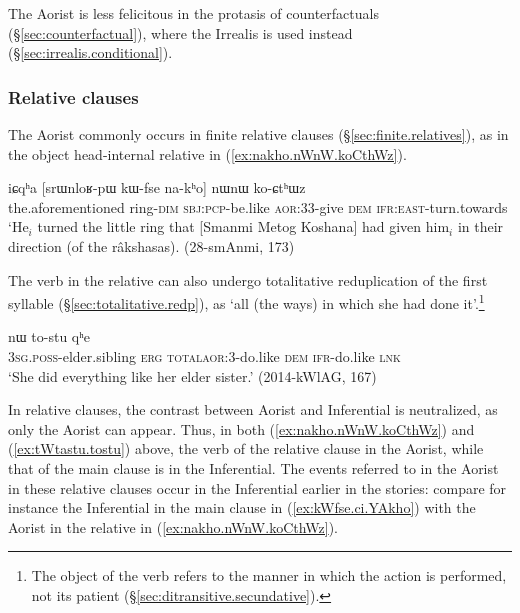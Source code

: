 The Aorist is less felicitous in the protasis of counterfactuals (§\ref{sec:counterfactual}), where the Irrealis is used instead (§\ref{sec:irrealis.conditional}).

\subsubsection{Relative clauses }   \label{sec:aor.relative}
The Aorist commonly occurs in finite relative clauses (§\ref{sec:finite.relatives}), as in the object head-internal relative in (\ref{ex:nakho.nWnW.koCthWz}).


\begin{exe}
\ex \label{ex:nakho.nWnW.koCthWz}
\gll iɕqʰa [srɯnloʁ-pɯ kɯ-fse na-kʰo] nɯnɯ ko-ɕtʰɯz \\
the.aforementioned ring-\textsc{dim} \textsc{sbj}:\textsc{pcp}-be.like \textsc{aor}:3\fl{}3-give \textsc{dem} \textsc{ifr}:\textsc{east}-turn.towards \\
\glt `He$_i$ turned the little ring that [Smanmi Metog Koshana] had given him$_i$ in their direction (of the râkshasas). (28-smAnmi, 173)
\end{exe}

The verb in the relative can also undergo totalitative reduplication of the first syllable (§\ref{sec:totalitative.redp}), as  `all (the ways) in which she had done it'.\footnote{The object of the verb  refers to the manner in which the action is performed, not its patient (§\ref{sec:ditransitive.secundative}). }

\begin{exe}
\ex \label{ex:tWtastu.tostu}
 nɯ to-stu qʰe \\
\textsc{3sg}.\textsc{poss}-elder.sibling \textsc{erg} \textsc{total}\redp{}\textsc{aor}:3\flobv{}-do.like \textsc{dem} \textsc{ifr}-do.like \textsc{lnk} \\
\glt `She did everything like her elder sister.' (2014-kWlAG, 167)
\end{exe}

In relative clauses, the contrast between Aorist and Inferential is neutralized, as only the Aorist can appear. Thus, in both (\ref{ex:nakho.nWnW.koCthWz}) and (\ref{ex:tWtastu.tostu}) above, the verb of the relative clause in the Aorist, while that of the main clause is in the Inferential. The events referred to in the Aorist in these relative clauses occur in the Inferential earlier in the stories: compare for instance the Inferential  in the main clause in (\ref{ex:kWfse.ci.YAkho}) with the Aorist  in the relative in (\ref{ex:nakho.nWnW.koCthWz}).

